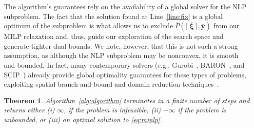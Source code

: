 \documentclass[pdflatex,sn-mathphys-num]{sn-jnl}%
\newcommand{\new}[1]{#1}
\newtheorem{theorem}{Theorem}%
\begin{document}
\new{%
The algorithm's guarantees rely on the availability of a global solver for the NLP subproblem.
The fact that the solution found at Line~\ref{line:fix} is a global optimum of the subproblem is what allows us to exclude $\overline{P}(\lceil\, \overline{\bm{\xi}} \,\rceil,\overline{\bm{y}})$ from our MILP relaxation and, thus, guide our exploration of the search space and generate tighter dual bounds.
We note, however, that this is not such a strong assumption, as although the NLP subproblem may be nonconvex, it is smooth and bounded.
In fact, many contemporary solvers (e.g., Gurobi~\cite{gurobi}, BARON~\cite{sahinidisBARONGeneralPurpose1996,zhangSolvingContinuousDiscrete2024}, and SCIP~\cite{BolusaniEtal2024OO,BolusaniEtal2024ZR}) already provide global optimality guarantees for these types of problems, exploiting spatial branch-and-bound and domain reduction techniques~\cite{puranikDomainReductionTechniques2017a}.
}

\begin{theorem}\label{theo}
    Algorithm~\ref{alg:algorithm} terminates in a finite number of steps and returns either (i) $\infty$, if the problem is infeasible, (ii) $-\infty$ if the problem is unbounded, or (iii) an optimal solution to \ref{eq:minlp}.
\end{theorem}
\end{document}
